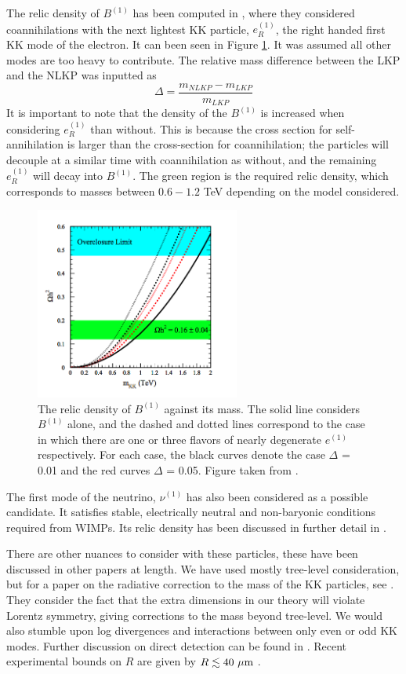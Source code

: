 The relic density of $B^{(1)}$ has been computed in \cite{Servant:2002}, where they considered coannihilations with the next lightest KK particle, $e^{(1)}_R$, the right handed first KK mode of the electron. It can been seen in Figure \ref{fig:RelicDensity}. It was assumed all other modes are too heavy to contribute. The relative mass difference between the LKP and the NLKP was inputted as 
\begin{equation}
    \Delta = \frac{m_{NLKP} - m_{LKP}}{m_{LKP}}
\end{equation}
It is important to note that the density of the $B^{(1)}$ is increased when considering $e^{(1)}_R$ than without. This is because the cross section for self-annihilation is larger than the cross-section for coannihilation; the particles will decouple at a similar time with coannihilation as without, and the remaining $e^{(1)}_R$ will decay into $B^{(1)}$. The green region is the required relic density, which corresponds to masses between $0.6 - 1.2$ TeV depending on the model considered.
\begin{figure}[htbp]
    \centering
    \includegraphics[width=0.6\textwidth]{RelicDensity.png}
    \caption{\label{fig:RelicDensity}The relic density of $B^{(1)}$ against its mass. The solid line considers $B^{(1)}$ alone, and the dashed and dotted lines correspond to the case in which there are one or three flavors of nearly degenerate $e^{(1)}$ respectively. For each case, the black curves denote the case $\Delta$ = 0.01 and the red curves $\Delta$ = 0.05. Figure taken from \cite{Servant:2002}.}
\end{figure}

The first mode of the neutrino, $\nu^{(1)}$ has also been considered as a possible candidate. It satisfies stable, electrically neutral and non-baryonic conditions required from WIMPs. Its relic density has been discussed in further detail in \cite{Servant:2002}.

There are other nuances to consider with these particles, these have been discussed in other papers at length. We have used mostly tree-level consideration, but for a paper on the radiative correction to the mass of the KK particles, see \cite{Cheng:2002iz}. They consider the fact that the extra dimensions in our theory will violate Lorentz symmetry, giving corrections to the mass beyond tree-level. We would also stumble upon log divergences and interactions between only even or odd KK modes. Further discussion on direct detection can be found in \cite{Servant:2002hb}. Recent experimental bounds on $R$ are given by $R \lesssim 40 ~\rm \mu m$ \cite{Kapner:2006si}.